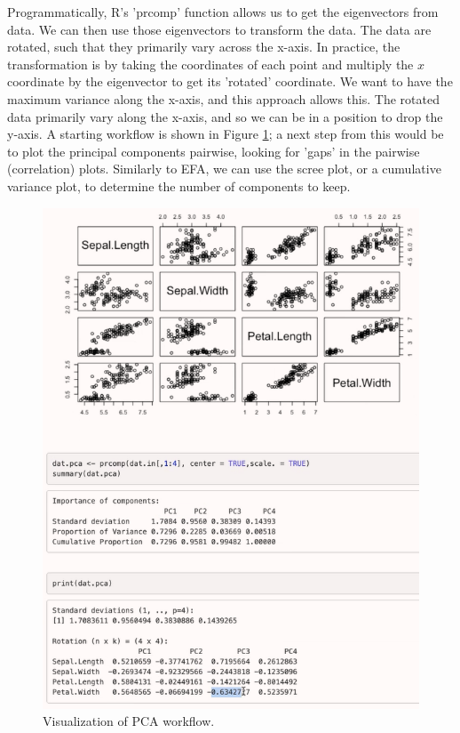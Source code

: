 \documentclass[11pt]{article}
\begin{document}
Programmatically, R's 'prcomp' function allows us to get the eigenvectors from data.
We can then use those eigenvectors to transform the data.
The data are rotated, such that they primarily vary across the x-axis.
In practice, the transformation is by taking the coordinates of each point and multiply the $x$ coordinate by the eigenvector to get its 'rotated' coordinate.
We want to have the maximum variance along the x-axis, and this approach allows this.
The rotated data primarily vary along the x-axis, and so we can be in a position to drop the y-axis.
A starting workflow is shown in Figure \ref{fig:PCA_Image1}; a next step from this would be to plot the principal components pairwise, looking for 'gaps' in the pairwise (correlation) plots.
Similarly to EFA, we can use the scree plot, or a cumulative variance plot, to determine the number of components to keep.

\begin{figure}[ht]
    \centering
    \caption{Visualization of PCA workflow.}
    \label{fig:PCA_Image1}
    \includegraphics[width=\textwidth]{Images/PCA_Image1.png}
\end{figure}
\end{document}
